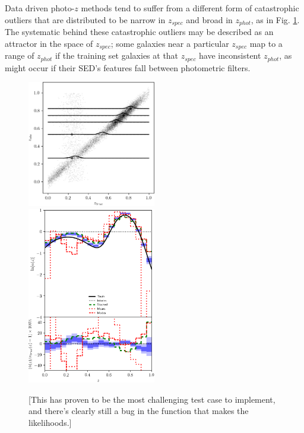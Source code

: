 \documentclass[iop]{emulateapj}
\begin{document}
Data driven photo-$z$ methods tend to suffer from a different form of 
catastrophic outliers that are distributed to be narrow in $z_{spec}$ and broad 
in $z_{phot}$, as in Fig. \ref{fig:traincatout}.  The systematic behind these 
catastrophic outliers may be described as an attractor in the space of 
$z_{spec}$; some galaxies near a particular $z_{spec}$ map to a range of 
$z_{phot}$ if the training set galaxies at that $z_{spec}$ have inconsistent 
$z_{phot}$, as might occur if their SED's features fall between photometric 
filters.

\begin{figure}
	\begin{center}
		
\includegraphics[width=0.5\textwidth]{fig/training_outliers/scatter.png}\\
		
\includegraphics[width=0.5\textwidth]{fig/training_outliers/estimators.png}	
		\caption{[This has proven to be the most challenging test case 
to implement, and there's clearly still a bug in the function that makes the 
likelihoods.]}
		\label{fig:traincatout}
	\end{center}
\end{figure}
\end{document}
